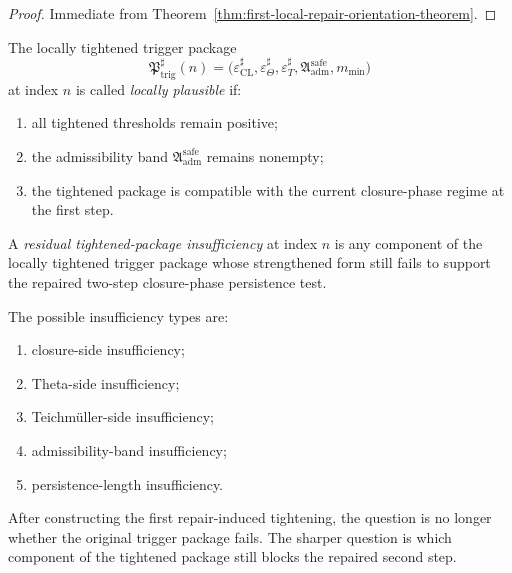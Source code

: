 \begin{proof}
Immediate from Theorem~\ref{thm:first-local-repair-orientation-theorem}.
\end{proof}




\begin{definition}
\label{def:locally-plausible-tightened-trigger-package}
The locally tightened trigger package
\[
\mathfrak{P}_{\mathrm{trig}}^{\sharp}(n)
=
\bigl(
\varepsilon_{\mathrm{CL}}^{\sharp},
\varepsilon_{\Theta}^{\sharp},
\varepsilon_{T}^{\sharp},
\mathfrak{A}_{\mathrm{adm}}^{\mathrm{safe}},
m_{\min}
\bigr)
\]
at index $n$ is called \emph{locally plausible} if:
\begin{enumerate}
    \item all tightened thresholds remain positive;
    \item the admissibility band $\mathfrak{A}_{\mathrm{adm}}^{\mathrm{safe}}$ remains nonempty;
    \item the tightened package is compatible with the current closure-phase regime at the first step.
\end{enumerate}
\end{definition}

\begin{definition}
\label{def:residual-tightened-package-insufficiency}
A \emph{residual tightened-package insufficiency} at index $n$ is any component of the locally tightened trigger package whose strengthened form still fails to support the repaired two-step closure-phase persistence test.

The possible insufficiency types are:
\begin{enumerate}
    \item closure-side insufficiency;
    \item Theta-side insufficiency;
    \item Teichm\"uller-side insufficiency;
    \item admissibility-band insufficiency;
    \item persistence-length insufficiency.
\end{enumerate}
\end{definition}

\begin{remark}
\label{rem:what-the-new-audit-should-decide}
After constructing the first repair-induced tightening, the question is no longer whether the original trigger package fails.
The sharper question is which component of the tightened package still blocks the repaired second step.
\end{remark}

